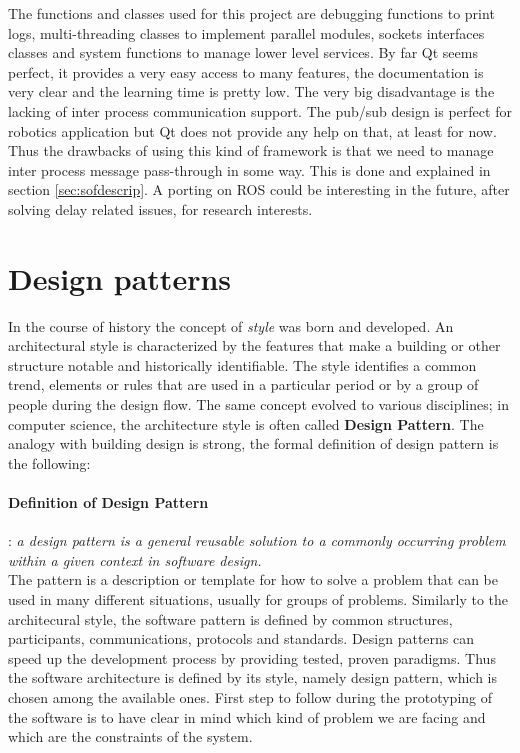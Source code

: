 The functions and classes used for this project are debugging functions to print logs, multi-threading classes to implement parallel modules, sockets interfaces classes and system functions to manage lower level services. By far Qt seems perfect, it provides a very easy access to many features, the documentation is very clear and the learning time is pretty low. The very big disadvantage is the lacking of inter process communication support. The pub/sub design is perfect for robotics application but Qt does not provide any help on that, at least for now. Thus the drawbacks of using this kind of framework is that we need to manage inter process message pass-through in some way. This is done and explained in section \ref{sec:sofdescrip}. A porting on ROS could be interesting in the future, after solving delay related issues, for research interests.
\section{Design patterns}
\label{sec:patterns}
In the course of history the concept of \textit{style} was born and developed. An architectural style is characterized by the features that make a building or other structure notable and historically identifiable. The style identifies a common trend, elements or rules that are used in a particular period or by a group of people during the design flow. The same concept evolved to various disciplines; in computer science, the architecture style is often called \textbf{Design Pattern}. The analogy with building design is strong, the formal definition of design pattern is the following: 
\paragraph{Definition of Design Pattern}:  \textit{a design pattern is a general reusable solution to a commonly occurring problem within a given context in software design.} \\

\noindent
The pattern is a description or template for how to solve a problem that can be used in many different situations, usually for groups of problems. Similarly to the architecural style, the software pattern is defined by common structures, participants, communications, protocols and standards. Design patterns can speed up the development process by providing tested, proven paradigms. Thus the software architecture is defined by its style, namely design pattern, which is chosen among the available ones. First step to follow during the prototyping of the software is to have clear in mind which kind of problem we are facing and which are the constraints of the system. 

